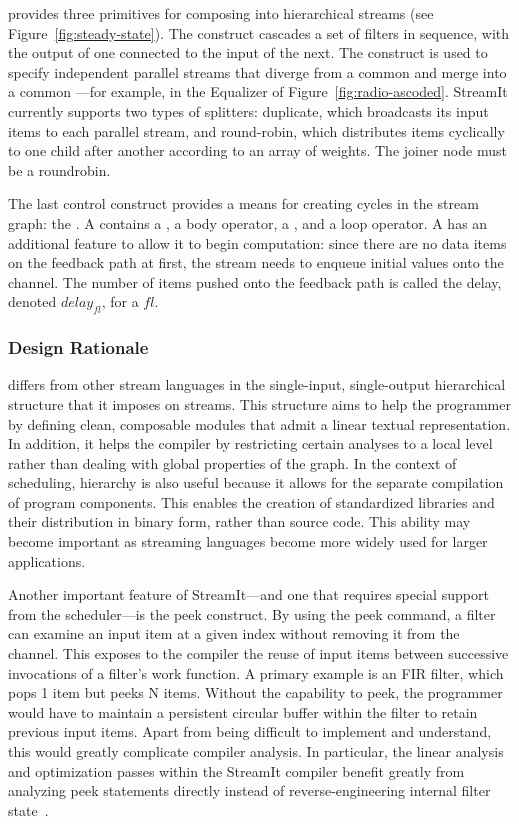 {\StreamIt} provides three primitives for composing {\filters} into
hierarchical streams (see Figure~\ref{fig:steady-state}).  The
{\pipeline} construct cascades a set of filters in sequence, with the
output of one connected to the input of the next.  The {\splitjoin}
construct is used to specify independent parallel streams that diverge
from a common {\splitter} and merge into a common {\joiner}---for
example, in the Equalizer of Figure~\ref{fig:radio-ascoded}.  StreamIt
currently supports two types of splitters: duplicate, which broadcasts
its input items to each parallel stream, and round-robin, which
distributes items cyclically to one child after another according to
an array of weights.  The joiner node must be a roundrobin.

The last control construct provides a means for creating cycles in the
stream graph: the {\feedbackloop}. A {\feedbackloop} contains a
{\joiner}, a body operator, a {\splitter}, and a loop operator.  A
{\feedbackloop} has an additional feature to allow it to begin
computation: since there are no data items on the feedback path at
first, the stream needs to enqueue initial values onto the channel.
The number of items pushed onto the feedback path is called the delay,
denoted $delay_{fl}$, for a {\feedbackloop} $fl$.

\subsubsection{Design Rationale}

{\StreamIt} differs from other stream languages in the single-input,
single-output hierarchical structure that it imposes on streams.  This
structure aims to help the programmer by defining clean, composable
modules that admit a linear textual representation.  In addition, it
helps the compiler by restricting certain analyses to a local level
rather than dealing with global properties of the graph.  In the
context of scheduling, hierarchy is also useful because it allows for
the separate compilation of program components.  This enables the
creation of standardized libraries and their distribution in binary
form, rather than source code.  This ability may become important as
streaming languages become more widely used for larger applications.

Another important feature of StreamIt---and one that requires special
support from the scheduler---is the peek construct.  By using the peek
command, a filter can examine an input item at a given index without
removing it from the channel.  This exposes to the compiler the reuse
of input items between successive invocations of a filter's work
function.  A primary example is an FIR filter, which pops 1 item but
peeks N items.  Without the capability to peek, the programmer would
have to maintain a persistent circular buffer within the filter to
retain previous input items.  Apart from being difficult to implement
and understand, this would greatly complicate compiler analysis.  In
particular, the linear analysis and optimization passes within the
StreamIt compiler benefit greatly from analyzing peek statements
directly instead of reverse-engineering internal filter
state~\cite{lamb03}.

